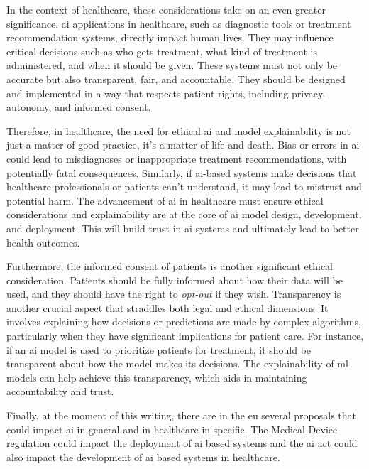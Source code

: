 In the context of healthcare, these considerations take on an even greater significance. \ac{ai} applications in healthcare, such as diagnostic tools or treatment recommendation systems, directly impact human lives. They may influence critical decisions such as who gets treatment, what kind of treatment is administered, and when it should be given. These systems must not only be accurate but also transparent, fair, and accountable. They should be designed and implemented in a way that respects patient rights, including privacy, autonomy, and informed consent.

Therefore, in healthcare, the need for ethical \ac{ai} and model explainability is not just a matter of good practice, it's a matter of life and death. Bias or errors in \ac{ai} could lead to misdiagnoses or inappropriate treatment recommendations, with potentially fatal consequences. Similarly, if \ac{ai}-based systems make decisions that healthcare professionals or patients can't understand, it may lead to mistrust and potential harm. The advancement of \ac{ai} in healthcare must ensure ethical considerations and explainability are at the core of \ac{ai} model design, development, and deployment. This will build trust in \ac{ai} systems and ultimately lead to better health outcomes.

Furthermore, the informed consent of patients is another significant ethical consideration. Patients should be fully informed about how their data will be used, and they should have the right to \textit{opt-out} if they wish.
Transparency is another crucial aspect that straddles both legal and ethical dimensions. It involves explaining how decisions or predictions are made by complex algorithms, particularly when they have significant implications for patient care. For instance, if an \ac{ai} model is used to prioritize patients for treatment, it should be transparent about how the model makes its decisions. The explainability of \ac{ml} models can help achieve this transparency, which aids in maintaining accountability and trust.

Finally, at the moment of this writing, there are in the \ac{eu} several proposals that could impact \ac{ai} in general and in healthcare in specific.
The Medical Device regulation could impact the deployment of \ac{ai} based systems and the \ac{ai} act could also impact the development of \ac{ai} based systems in healthcare.
